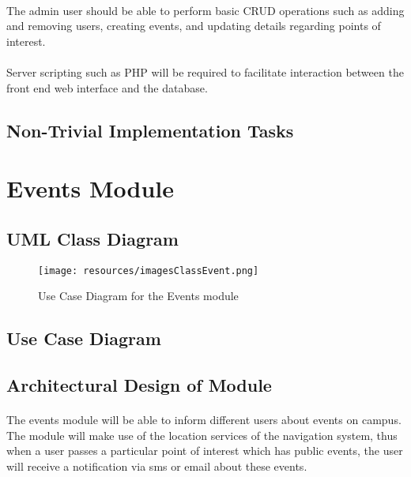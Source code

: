 \documentclass{article}
\begin{document}
\paragraph{}The admin user should be able to perform basic CRUD operations such as adding and removing users, creating events, and updating details regarding points of interest. 

\paragraph{}Server scripting such as PHP will be required to facilitate interaction between the front end web interface and the database.

\subsection{Non-Trivial Implementation Tasks}



\section{Events Module}
\subsection{UML Class Diagram}

\begin{figure}[H]
\centering
\texttt{[image: resources/imagesClassEvent.png]}
\caption{Use Case Diagram for the Events module}
\end{figure}

\subsection {Use Case Diagram}

\subsection{Architectural Design of Module}
\paragraph{}The events module will be able to inform different users about events on campus. The module will make use of the location services of the navigation system, thus when a user passes a particular point of interest which has public events, the user will receive a notification via sms or email about these events. 
\end{document}
